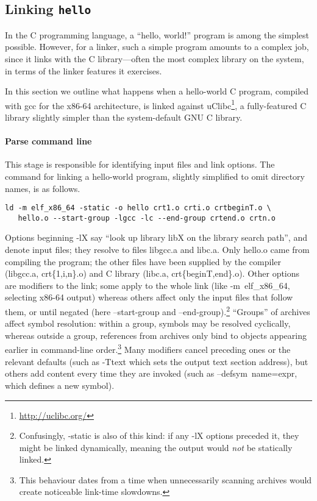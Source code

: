 \subsection{Linking \texttt{hello}}
\label{sec:hello}

In the C programming language, a ``hello, world!'' program is among the simplest possible.
However, for a linker, such a simple program amounts to a complex job,
since it links with the C library---often the most complex library on the system,
in terms of the linker features it exercises.

In this section we outline what happens when a hello-world C program, compiled with \textsf{gcc} 
for the x86-64 architecture,
is linked against uClibc\footnote{\url{http://uclibc.org/}}, 
a fully-featured C library slightly simpler than the system-default GNU C library.

\paragraph{Parse command line}
This stage is responsible for identifying input files and link options.
The command for linking a hello-world program, slightly simplified to omit directory names, 
is as follows.

\begin{lstlisting}[language=plain,basicstyle=\footnotesize\ttfamily]
ld -m elf_x86_64 -static -o hello crt1.o crti.o crtbeginT.o \
   hello.o --start-group -lgcc -lc --end-group crtend.o crtn.o 
\end{lstlisting}

Options beginning \textsf{-lX} say ``look up library \textsf{libX} on the library search path'', 
and denote input files; they resolve to files \textsf{libgcc.a} and \textsf{libc.a}.
Only \textsf{hello.o} came from compiling the program;
the other files have been supplied by the compiler (\textsf{libgcc.a}, \textsf{crt\{1,i,n\}.o})
and C library (\textsf{libc.a}, \textsf{crt\{beginT,end\}.o}).
Other options are modifiers to the link; some apply to the whole link 
(like \textsf{-m~elf\_x86\_64}, selecting x86-64 output)
whereas others affect only the input files that follow them, or until negated 
(here \textsf{--start-group} and \textsf{--end-group}).\footnote{Confusingly, \textsf{-static} is 
also of this kind: if any \textsf{-lX} options preceded it, they might be linked dynamically, meaning the output
would \emph{not} be statically linked.}
``Groups'' of archives affect symbol resolution: within a group,
symbols may be resolved cyclically, whereas outside a group, 
references from archives only bind to objects appearing earlier in command-line order.\footnote{This
behaviour dates from a time when unnecessarily scanning archives would create
noticeable link-time slowdowns.}
Many modifiers cancel preceding ones or the relevant defaults 
(such as \textsf{-Ttext} which sets the output text section address), 
but others add content every time they are invoked
(such as \textsf{--defsym~name=expr}, which defines a new symbol).

